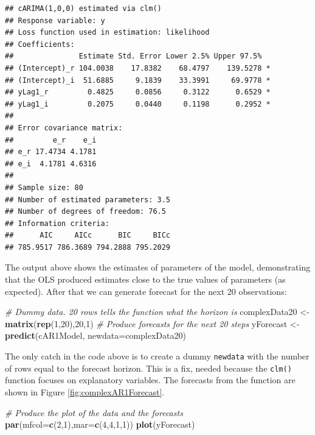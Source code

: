 \documentclass[
]{book}
\newenvironment{Shaded}{\begin{snugshade}}{\end{snugshade}}
\newcommand{\CommentTok}[1]{\textcolor[rgb]{0.56,0.35,0.01}{\textit{#1}}}
\newcommand{\DataTypeTok}[1]{\textcolor[rgb]{0.13,0.29,0.53}{#1}}
\newcommand{\DecValTok}[1]{\textcolor[rgb]{0.00,0.00,0.81}{#1}}
\newcommand{\KeywordTok}[1]{\textcolor[rgb]{0.13,0.29,0.53}{\textbf{#1}}}
\newcommand{\NormalTok}[1]{#1}
\newcommand{\StringTok}[1]{\textcolor[rgb]{0.31,0.60,0.02}{#1}}
\begin{document}
\begin{verbatim}
## cARIMA(1,0,0) estimated via clm()
## Response variable: y
## Loss function used in estimation: likelihood
## Coefficients:
##               Estimate Std. Error Lower 2.5% Upper 97.5%  
## (Intercept)_r 104.0038    17.8382    68.4797    139.5278 *
## (Intercept)_i  51.6885     9.1839    33.3991     69.9778 *
## yLag1_r         0.4825     0.0856     0.3122      0.6529 *
## yLag1_i         0.2075     0.0440     0.1198      0.2952 *
## 
## Error covariance matrix:
##         e_r    e_i
## e_r 17.4734 4.1781
## e_i  4.1781 4.6316
## 
## Sample size: 80
## Number of estimated parameters: 3.5
## Number of degrees of freedom: 76.5
## Information criteria:
##      AIC     AICc      BIC     BICc 
## 785.9517 786.3689 794.2888 795.2029
\end{verbatim}

The output above shows the estimates of parameters of the model, demonstrating that the OLS produced estimates close to the true values of parameters (as expected). After that we can generate forecast for the next 20 observations:

\begin{Shaded}
\begin{Highlighting}[]
\CommentTok{\# Dummy data. 20 rows tells the function what the horizon is}
\NormalTok{complexData20 \textless{}{-}}\StringTok{ }\KeywordTok{matrix}\NormalTok{(}\KeywordTok{rep}\NormalTok{(}\DecValTok{1}\NormalTok{,}\DecValTok{20}\NormalTok{),}\DecValTok{20}\NormalTok{,}\DecValTok{1}\NormalTok{)}
\CommentTok{\# Produce forecasts for the next 20 steps}
\NormalTok{yForecast \textless{}{-}}\StringTok{ }\KeywordTok{predict}\NormalTok{(cAR1Model, }\DataTypeTok{newdata=}\NormalTok{complexData20)}
\end{Highlighting}
\end{Shaded}

The only catch in the code above is to create a dummy \texttt{newdata} with the number of rows equal to the forecast horizon. This is a fix, needed because the \texttt{clm()} function focuses on explanatory variables. The forecasts from the function are shown in Figure \ref{fig:complexAR1Forecast}.

\begin{Shaded}
\begin{Highlighting}[]
\CommentTok{\# Produce the plot of the data and the forecasts}
\KeywordTok{par}\NormalTok{(}\DataTypeTok{mfcol=}\KeywordTok{c}\NormalTok{(}\DecValTok{2}\NormalTok{,}\DecValTok{1}\NormalTok{),}\DataTypeTok{mar=}\KeywordTok{c}\NormalTok{(}\DecValTok{4}\NormalTok{,}\DecValTok{4}\NormalTok{,}\DecValTok{1}\NormalTok{,}\DecValTok{1}\NormalTok{))}
\KeywordTok{plot}\NormalTok{(yForecast)}
\end{Highlighting}
\end{Shaded}
\end{document}
